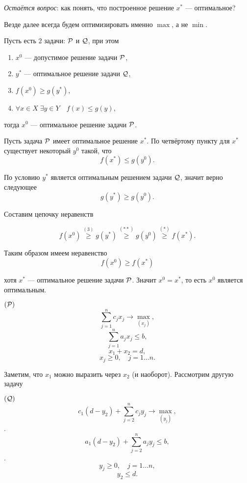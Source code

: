 \textit{Остаётся вопрос}: как понять, что построенное решение $x^*$ --- оптимальное?

\remark

Везде далее всегда будем оптимизировать именно $\max$, а не $\min$.

\label{fact:reduction_to_other_problem}

Пусть есть 2 задачи: $\P$ и $\Q$, при этом
\begin{enumerate}[nosep]
	\item $x^0$ --- допустимое решение задачи $\P$,
	
	\item $y^*$ --- оптимальное решение задачи $\Q$,
	
	\item $f(x^0) \ge g(y^*)$,
	
	\item $\forall x \in X \; \exists y \in Y \quad f(x) \le g(y)$,
\end{enumerate}

тогда $x^0$ --- оптимальное решение задачи $\P$.

\prooof

Пусть задача $\P$ имеет оптимальное решение $x^*$. По четвёртому пункту для $x^*$ существует некоторый $y^0$ такой, что 
\[
f(x^*) \le g(y^0). \tag{*}
\]

По условию $y^*$ является оптимальным решением задачи $\Q$, значит верно следующее
\[
g(y^*) \ge g(y^0). \tag{**}
\]

Составим цепочку неравенств

\[
f(x^0) \stackrel{(3)}{\ge} g(y^*) \stackrel{(**)}{\ge} g(y^0) \stackrel{(*)}{\ge} f(x^*).
\]

Таким образом имеем неравенство
\[
f(x^0) \ge f(x^*)
\]

хотя $x^*$ --- оптимальное решение задачи $\P$. Значит $x^0 = x^*$, то есть $x^0$ является оптимальным.

\example

$(\P)$
\[\sum_{j=1}^{n} c_j x_j \to \max_{(x_j)},\]
\[\sum_{j=1}^{n} a_j x_j \le b \tag{1},\]
\[x_1 + x_2 = d \tag{2},\]
\[x_j \ge 0, \quad j = 1\dots n. \tag{3}\]

Заметим, что $x_1$ можно выразить через $x_2$ (и наоборот). Рассмотрим другую задачу

$(\Q)$
\[c_1(d - y_2) + \sum_{j=2}^{n} c_j y_j \to \max_{(y_j)},\].
\[a_1 (d-y_2) + \sum_{j=2}^{n}a_j y_j \le b,\].
\[y_j \ge 0, \quad j = 1\dots n,\]
\[y_2 \le d.\]

